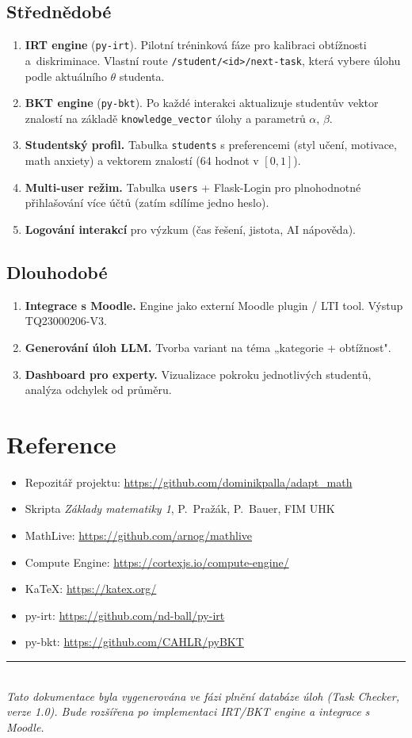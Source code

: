 \documentclass[11pt,a4paper]{article}
\begin{document}
\subsection{Střednědobé}

\begin{enumerate}
  \item \textbf{IRT engine} (\texttt{py-irt}). Pilotní tréninková fáze pro kalibraci obtížnosti a~diskriminace. Vlastní route \texttt{/student/<id>/next-task}, která vybere úlohu podle aktuálního $\theta$ studenta.
  \item \textbf{BKT engine} (\texttt{py-bkt}). Po každé interakci aktualizuje studentův vektor znalostí na základě \texttt{knowledge\_vector} úlohy a parametrů $\alpha$, $\beta$.
  \item \textbf{Studentský profil.} Tabulka \texttt{students} s preferencemi (styl učení, motivace, math anxiety) a vektorem znalostí (64 hodnot v $[0, 1]$).
  \item \textbf{Multi-user režim.} Tabulka \texttt{users} + Flask-Login pro plnohodnotné přihlašování více účtů (zatím sdílíme jedno heslo).
  \item \textbf{Logování interakcí} pro výzkum (čas řešení, jistota, AI nápověda).
\end{enumerate}

\subsection{Dlouhodobé}

\begin{enumerate}
  \item \textbf{Integrace s Moodle.} Engine jako externí Moodle plugin / LTI tool. Výstup TQ23000206-V3.
  \item \textbf{Generování úloh LLM.} Tvorba variant na téma „kategorie + obtížnost".
  \item \textbf{Dashboard pro experty.} Vizualizace pokroku jednotlivých studentů, analýza odchylek od průměru.
\end{enumerate}

\section{Reference}

\begin{itemize}
  \item Repozitář projektu: \url{https://github.com/dominikpalla/adapt_math}
  \item Skripta \emph{Základy matematiky 1}, P.~Pražák, P.~Bauer, FIM UHK
  \item MathLive: \url{https://github.com/arnog/mathlive}
  \item Compute Engine: \url{https://cortexjs.io/compute-engine/}
  \item KaTeX: \url{https://katex.org/}
  \item py-irt: \url{https://github.com/nd-ball/py-irt}
  \item py-bkt: \url{https://github.com/CAHLR/pyBKT}
\end{itemize}

\vspace{2em}
\noindent\rule{\linewidth}{0.4pt}\\[2pt]
{\small\itshape Tato dokumentace byla vygenerována ve fázi plnění databáze úloh (Task Checker, verze 1.0). Bude rozšířena po implementaci IRT/BKT engine a integrace s Moodle.}
\end{document}
